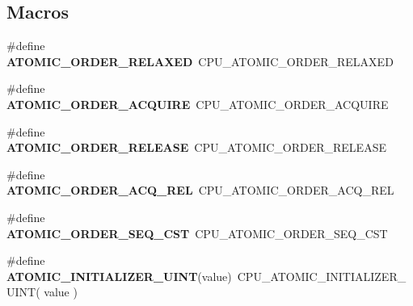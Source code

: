 \subsection*{Macros}
\begin{DoxyCompactItemize}
\item 
\mbox{\label{group__RTEMSScoreAtomic_ga685b401a472ad1666f0b7c2347ecfa89}} 
\#define {\bfseries A\+T\+O\+M\+I\+C\+\_\+\+O\+R\+D\+E\+R\+\_\+\+R\+E\+L\+A\+X\+ED}~C\+P\+U\+\_\+\+A\+T\+O\+M\+I\+C\+\_\+\+O\+R\+D\+E\+R\+\_\+\+R\+E\+L\+A\+X\+ED
\item 
\mbox{\label{group__RTEMSScoreAtomic_gaeb9b8217e4ade82423f7d8f37ad51df0}} 
\#define {\bfseries A\+T\+O\+M\+I\+C\+\_\+\+O\+R\+D\+E\+R\+\_\+\+A\+C\+Q\+U\+I\+RE}~C\+P\+U\+\_\+\+A\+T\+O\+M\+I\+C\+\_\+\+O\+R\+D\+E\+R\+\_\+\+A\+C\+Q\+U\+I\+RE
\item 
\mbox{\label{group__RTEMSScoreAtomic_ga49f81882c9a781b8e6b045eec5bf53b6}} 
\#define {\bfseries A\+T\+O\+M\+I\+C\+\_\+\+O\+R\+D\+E\+R\+\_\+\+R\+E\+L\+E\+A\+SE}~C\+P\+U\+\_\+\+A\+T\+O\+M\+I\+C\+\_\+\+O\+R\+D\+E\+R\+\_\+\+R\+E\+L\+E\+A\+SE
\item 
\mbox{\label{group__RTEMSScoreAtomic_gac9a8e198f998276fac54960ccc724ec4}} 
\#define {\bfseries A\+T\+O\+M\+I\+C\+\_\+\+O\+R\+D\+E\+R\+\_\+\+A\+C\+Q\+\_\+\+R\+EL}~C\+P\+U\+\_\+\+A\+T\+O\+M\+I\+C\+\_\+\+O\+R\+D\+E\+R\+\_\+\+A\+C\+Q\+\_\+\+R\+EL
\item 
\mbox{\label{group__RTEMSScoreAtomic_gacd373800ba35bc621beddc54330ae53c}} 
\#define {\bfseries A\+T\+O\+M\+I\+C\+\_\+\+O\+R\+D\+E\+R\+\_\+\+S\+E\+Q\+\_\+\+C\+ST}~C\+P\+U\+\_\+\+A\+T\+O\+M\+I\+C\+\_\+\+O\+R\+D\+E\+R\+\_\+\+S\+E\+Q\+\_\+\+C\+ST
\item 
\mbox{\label{group__RTEMSScoreAtomic_ga55d3e8db55e05a772b467a3031874268}} 
\#define {\bfseries A\+T\+O\+M\+I\+C\+\_\+\+I\+N\+I\+T\+I\+A\+L\+I\+Z\+E\+R\+\_\+\+U\+I\+NT}(value)~C\+P\+U\+\_\+\+A\+T\+O\+M\+I\+C\+\_\+\+I\+N\+I\+T\+I\+A\+L\+I\+Z\+E\+R\+\_\+\+U\+I\+NT( value )
\item 
\mbox{\label{group__RTEMSScoreAtomic_gabe3bd793082623e018c54bb9f64f8ba1}} 

\end{DoxyCompactItemize}
